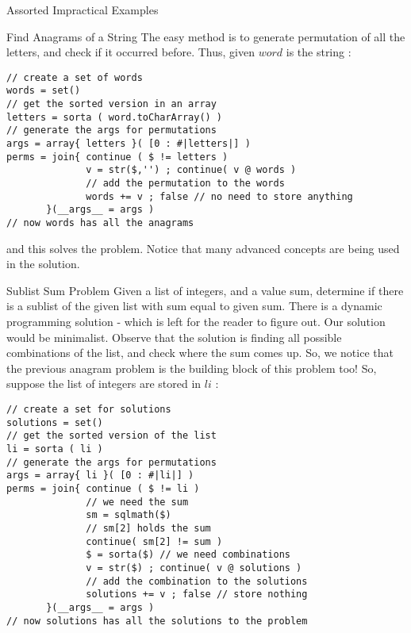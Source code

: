 \begin{section}{Assorted Impractical Examples}
\begin{subsection}{Find Anagrams of a String}
The easy method is to generate permutation of all the letters, and check if it occurred before.
Thus, given $word$ is the string :
\begin{center}\begin{minipage}{\linewidth}
\begin{lstlisting}[style=JexlStyle]
// create a set of words 
words = set()
// get the sorted version in an array 
letters = sorta ( word.toCharArray() )
// generate the args for permutations 
args = array{ letters }( [0 : #|letters|] )
perms = join{ continue ( $ != letters )
              v = str($,'') ; continue( v @ words )
              // add the permutation to the words
              words += v ; false // no need to store anything
       }(__args__ = args )
// now words has all the anagrams 
\end{lstlisting}  
\end{minipage}\end{center}
and this solves the problem. Notice that many advanced concepts are being used in the solution.
\end{subsection}

\begin{subsection}{Sublist Sum Problem}
Given a list of integers, and a value sum, determine if there is a sublist of the given list with sum equal to given sum.
There is a dynamic programming solution - which is left for the reader to figure out. 
Our solution would be minimalist. Observe that the solution is finding all possible combinations of the list, 
and check where the sum comes up. So, we notice that the previous anagram problem is the building block of this problem too!
So, suppose the list of integers are stored in $li$ :
\begin{center}\begin{minipage}{\linewidth}
\begin{lstlisting}[style=JexlStyle]
// create a set for solutions 
solutions = set()
// get the sorted version of the list 
li = sorta ( li )
// generate the args for permutations 
args = array{ li }( [0 : #|li|] )
perms = join{ continue ( $ != li )
              // we need the sum 
              sm = sqlmath($)
              // sm[2] holds the sum 
              continue( sm[2] != sum ) 
              $ = sorta($) // we need combinations 
              v = str($) ; continue( v @ solutions )
              // add the combination to the solutions
              solutions += v ; false // store nothing
       }(__args__ = args )
// now solutions has all the solutions to the problem 
\end{lstlisting}  
\end{minipage}\end{center}
\end{subsection}


\end{section}
